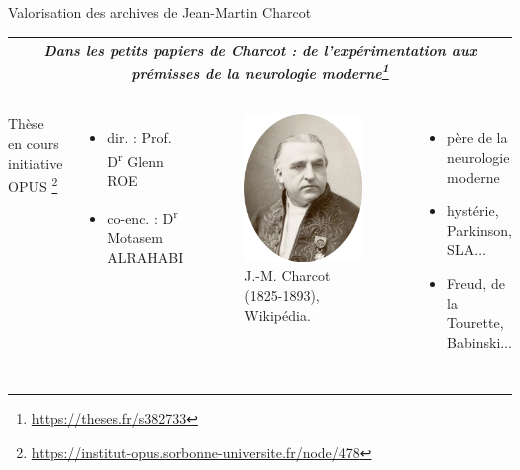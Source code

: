 \begin{frame}{Valorisation des archives de Jean-Martin Charcot}
	\vspace{-3ex}
	\begin{table}[h]
		\begin{tabular}{|c|}
			\hline
			\fontsize{9}{10}\selectfont \textit{Dans les petits papiers de Charcot : de l'expérimentation aux prémisses de la neurologie moderne\footnote{\url{https://theses.fr/s382733}}} \\ \hline
		\end{tabular}
	\end{table}
	\bigskip
	\begin{columns}
		Thèse en cours \\
		\footnotesize{initiative \textsc{OPUS}}%
		\setcounter{footnote}{1}%
		\footnote{\url{https://institut-opus.sorbonne-universite.fr/node/478}}\\
		\begin{itemize}
			\footnotesize
			\item dir. : Prof. D\textsuperscript{r} Glenn ROE
			\item co-enc. : D\textsuperscript{r} Motasem ALRAHABI
		\end{itemize}
		
		\begin{figure}
			\centering
			\includegraphics[width=.25\textwidth]{pic/Jean-Martin_Charcot-modified.png}
			\caption{J.-M. Charcot (1825-1893), \href{https://fr.wikipedia.org/wiki/Jean-Martin_Charcot\#/media/Fichier:Jean-Martin\_Charcot.jpg}\\
				{Wikipédia}.}
		\end{figure}
					\begin{itemize}
			\small
			\item père de la neurologie moderne
			\item hystérie, \og{}Parkinson\fg{}, \textsc{SLA}$\dots$
			\item Freud, de la Tourette, Babinski$\dots$
		\end{itemize}
	\end{columns}

\end{frame}
